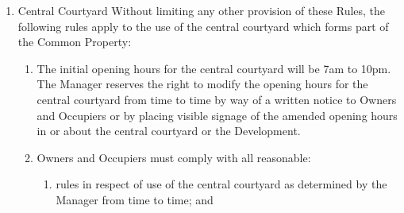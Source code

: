 \documentclass{article}
\begin{document}
\begin{enumerate}[label=\arabic*.]
\begin{enumerate}[label=\arabic{enumi}.\arabic*.]
\begin{enumerate}[label=(\arabic*)]
\begin{enumerate}[label=(\arabic*)]
\item  The Owners Corporation is not responsible for:

\begin{enumerate}[label=(\alph*)]

\item  any damage to a vehicle while inside the car park or while entering or leaving the car park;

\item  the theft of any vehicle or of any item within any vehicle parked in the car park;

\item  vehicles are parked and left in the car park as this is at the sole risk of the Lot Owner or Occupier.

\end{enumerate}

\item  An Owner or Occupier of a Lot may only wash and clean their vehicles in the designated car wash bay (if applicable) and must seek approval of the Manager should they require the use of the car wash bay for in excess of one hour.

\end{enumerate}

\item  Central Courtyard Without limiting any other provision of these Rules, the following rules apply to the use of the central courtyard which forms part of the Common Property:

\begin{enumerate}[label=(\arabic*)]

\item  The initial opening hours for the central courtyard will be 7am to 10pm. The Manager reserves the right to modify the opening hours for the central courtyard from time to time by way of a written notice to Owners and Occupiers or by placing visible signage of the amended opening hours in or about the central courtyard or the Development.
\newpage



\item  Owners and Occupiers must comply with all reasonable:

\begin{enumerate}[label=(\alph*)]

\item  rules in respect of use of the central courtyard as determined by the Manager from time to time; and


\end{enumerate}
\end{enumerate}
\end{enumerate}
\end{enumerate}
\end{enumerate}
\end{document}

